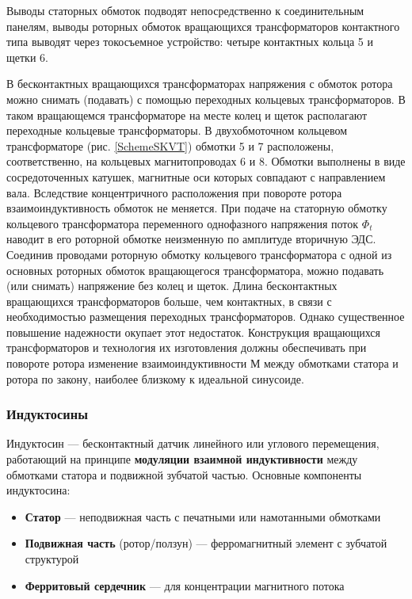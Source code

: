 Выводы статорных обмоток подводят непосредственно к соединительным панелям, выводы роторных обмоток вращающихся трансформаторов контактного типа 
выводят через токосъемное устройство: четыре контактных кольца 5 и щетки 6.

В бесконтактных вращающихся трансформаторах напряжения с обмоток ротора можно снимать (подавать) с помощью переходных кольцевых трансформаторов.
В таком вращающемся трансформаторе на месте колец и щеток располагают переходные кольцевые трансформаторы. 
В двухобмоточном кольцевом трансформаторе (рис. \ref{SchemeSKVT}) обмотки 5 и 7 расположены, соответственно, на кольцевых магнитопроводах 6 и 8.    
Обмотки выполнены в виде сосредоточенных катушек, магнитные оси которых совпадают с направлением вала. Вследствие концентричного расположения при повороте ротора взаимоиндуктивность 
обмоток не меняется. При подаче на статорную обмотку кольцевого трансформатора переменного однофазного напряжения поток $ \Phi_t $ наводит в его роторной обмотке неизменную по амплитуде вторичную ЭДС. Соединив проводами роторную обмотку кольцевого трансформатора с одной из основных роторных обмоток вращающегося трансформатора, можно подавать (или снимать) напряжение без колец и щеток. Длина бесконтактных вращающихся трансформаторов больше, чем контактных, в связи с необходимостью размещения переходных трансформаторов. Однако существенное повышение надежности окупает этот недостаток. Конструкция вращающихся трансформаторов и технология их изготовления должны обеспечивать при повороте ротора изменение взаимоиндуктивности М между обмотками статора и ротора по закону, наиболее близкому к идеальной синусоиде.


\subsubsection{Индуктосины}

Индуктосин — бесконтактный датчик линейного или углового перемещения, работающий на принципе \textbf{модуляции взаимной индуктивности} между обмотками статора 
и подвижной зубчатой частью. 
Основные компоненты индуктосина:
\begin{itemize}
    \item \textbf{Статор} — неподвижная часть с печатными или намотанными обмотками
    \item \textbf{Подвижная часть} (ротор/ползун) — ферромагнитный элемент с зубчатой структурой
    \item \textbf{Ферритовый сердечник} — для концентрации магнитного потока
\end{itemize}



